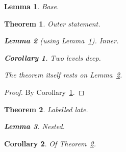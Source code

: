 \documentclass{article}
\newtheorem{theorem}{Theorem}
\newtheorem{lemma}{Lemma}
\newtheorem{corollary}{Corollary}
\begin{document}
\begin{lemma}\label{lem:base}Base.\end{lemma}

\begin{theorem}\label{thm:outer}Outer statement.
  \begin{lemma}[using Lemma~\ref{lem:base}]\label{lem:inner}Inner.
    \begin{corollary}\label{cor:deep}Two levels deep.\end{corollary}
  \end{lemma}
  The theorem itself rests on Lemma~\ref{lem:inner}.
\end{theorem}

\begin{proof}
  By Corollary~\ref{cor:deep}.
\end{proof}

\begin{theorem}Labelled late.
  \begin{lemma}\label{lem:early}Nested.\end{lemma}
  \label{thm:late}
\end{theorem}

\begin{corollary}\label{cor:last}Of Theorem~\ref{thm:late}.\end{corollary}
\end{document}
